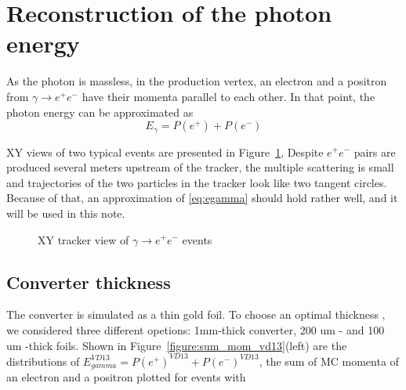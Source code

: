 \section{Reconstruction of the photon energy}

As the photon is massless, in the production vertex, an electron and a positron
from $\gamma \to e^+e^-$ have their momenta parallel to each other.
In that point, the photon energy can be approximated as
\begin{equation} \label{eq:egamma}
  E_\gamma = P(e^+) + P(e^-) 
\end{equation}
               
XY views of two typical events are presented in Figure~\ref{figure:rpc07b0s51r0100_xy_view},
Despite $e^+e^-$ pairs are produced several meters upstream of the tracker,
the multiple scattering is small and trajectories of the two particles
in the tracker look like two tangent circles. Because of that, an approximation of \ref{eq:egamma}
should hold rather well, and it will be used in this note.

\begin{figure}[H]
  \caption{
    \label{figure:rpc07b0s51r0100_xy_view}
    XY tracker view of $\gamma \to e^+e^-$ events
  }
\end{figure}

\subsection{Converter thickness}

The converter is simulated as a thin gold foil. To choose an optimal thickness ,
we considered three different opetions: 1mm-thick converter, 200 um - and 100 um -thick foils.
Shown in Figure~\ref{figure:sum_mom_vd13}(left) are the distributions of $E_{gamma}^{VD13} = P(e^+)^{VD13} + P(e^-)^{VD13}$,
the sum of MC momenta of an electron and a positron plotted for events with

